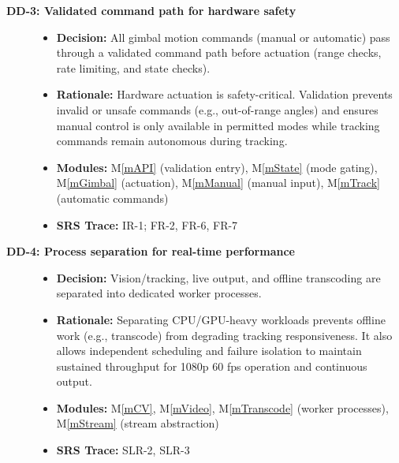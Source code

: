 \documentclass[12pt, titlepage]{article}
\newcommand{\mref}[1]{M\ref{#1}}
\begin{document}
\begin{description}
  \item[\textbf{DD-3: Validated command path for hardware safety}] \leavevmode
        \begin{itemize}
          \item \textbf{Decision:} All gimbal motion commands (manual or automatic) pass through a validated
                command path before actuation (range checks, rate limiting, and state checks).
          \item \textbf{Rationale:} Hardware actuation is safety-critical. Validation prevents invalid or unsafe
                commands (e.g., out-of-range angles) and ensures manual control is only available in permitted
                modes while tracking commands remain autonomous during tracking.
          \item \textbf{Modules:} \mref{mAPI} (validation entry), \mref{mState} (mode gating), \mref{mGimbal} (actuation),
                \mref{mManual} (manual input), \mref{mTrack} (automatic commands)
          \item \textbf{SRS Trace:} IR-1; FR-2, FR-6, FR-7
        \end{itemize}

  \item[\textbf{DD-4: Process separation for real-time performance}] \leavevmode
        \begin{itemize}
          \item \textbf{Decision:} Vision/tracking, live output, and offline transcoding are separated into
                dedicated worker processes.
          \item \textbf{Rationale:} Separating CPU/GPU-heavy workloads prevents offline work (e.g., transcode)
                from degrading tracking responsiveness. It also allows independent scheduling and failure isolation
                to maintain sustained throughput for 1080p 60 fps operation and continuous output.
          \item \textbf{Modules:} \mref{mCV}, \mref{mVideo}, \mref{mTranscode} (worker processes), \mref{mStream} (stream abstraction)
          \item \textbf{SRS Trace:} SLR-2, SLR-3
        \end{itemize}


\end{description}
\end{document}
